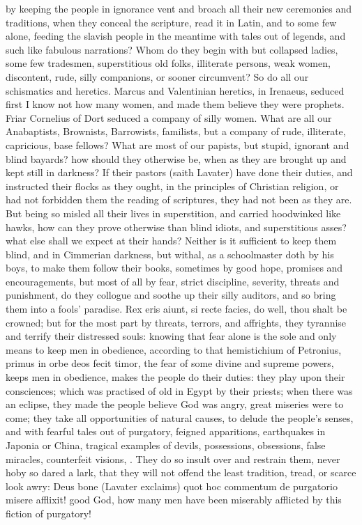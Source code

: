 {by keeping the people in ignorance vent and broach all their new
ceremonies and traditions, when they conceal the scripture, read it in
Latin, and to some few alone, feeding the slavish people in the
meantime with tales out of legends, and such like fabulous narrations?
Whom do they begin with but collapsed ladies, some few tradesmen,
superstitious old folks, illiterate persons, weak women, discontent,
rude, silly companions, or sooner circumvent? So do all our schismatics
and heretics. Marcus and Valentinian heretics, in Irenaeus,
seduced first I know not how many women, and made them believe they
were prophets. Friar Cornelius of Dort seduced a company of silly
women. What are all our Anabaptists, Brownists, Barrowists, familists,
but a company of rude, illiterate, capricious, base fellows? What are
most of our papists, but stupid, ignorant and blind bayards? how should
they otherwise be, when as they are brought up and kept still in
darkness? If their pastors (saith Lavater) have done their
duties, and instructed their flocks as they ought, in the principles of
Christian religion, or had not forbidden them the reading of
scriptures, they had not been as they are. But being so misled all
their lives in superstition, and carried hoodwinked like hawks, how can
they prove otherwise than blind idiots, and superstitious asses? what
else shall we expect at their hands? Neither is it sufficient to keep
them blind, and in Cimmerian darkness, but withal, as a schoolmaster
doth by his boys, to make them follow their books, sometimes by good
hope, promises and encouragements, but most of all by fear, strict
discipline, severity, threats and punishment, do they collogue and
soothe up their silly auditors, and so bring them into a fools'
paradise. Rex eris aiunt, si recte facies, do well, thou shalt be
crowned; but for the most part by threats, terrors, and affrights, they
tyrannise and terrify their distressed souls: knowing that fear alone
is the sole and only means to keep men in obedience, according to that
hemistichium of Petronius, primus in orbe deos fecit timor, the fear of
some divine and supreme powers, keeps men in obedience, makes the
people do their duties: they play upon their consciences; which
was practised of old in Egypt by their priests; when there was an
eclipse, they made the people believe God was angry, great miseries
were to come; they take all opportunities of natural causes, to delude
the people's senses, and with fearful tales out of purgatory, feigned
apparitions, earthquakes in Japonia or China, tragical examples of
devils, possessions, obsessions, false miracles, counterfeit visions,
\etc{}. They do so insult over and restrain them, never hoby so dared a
lark, that they will not offend the least tradition, tread, or
scarce look awry: Deus bone (Lavater exclaims) quot hoc commentum
de purgatorio misere afflixit! good God, how many men have been
miserably afflicted by this fiction of purgatory!

}
